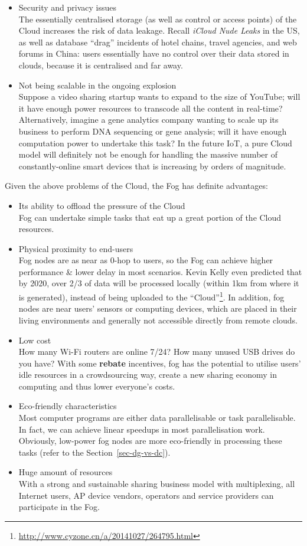 \begin{itemize}
	\item Security and privacy issues\\
	The essentially centralised storage (as well as control or access points) of the Cloud increases the risk of data leakage. Recall \emph{iCloud Nude Leaks} in the US, as well as database ``drag'' incidents of hotel chains, travel agencies, and web forums in China: users essentially have no control over their data stored in clouds, because it is centralised and far away. 
	\item Not being scalable in the ongoing explosion\\
	Suppose a video sharing startup wants to expand to the size of YouTube; will it have enough power resources to transcode all the content in real-time? Alternatively, imagine a gene analytics company wanting to scale up its business to perform DNA sequencing or gene analysis; will it have enough computation power to undertake this task? In the future IoT, a pure Cloud model will definitely not be enough for handling the massive number of constantly-online smart devices that is increasing by orders of magnitude. 
\end{itemize}

Given the above problems of the Cloud, the Fog has definite advantages: 
\begin{itemize}
	\item Its ability to offload the pressure of the Cloud\\
	Fog can undertake simple tasks that eat up a great portion of the Cloud resources.
	\item Physical proximity to end-users\\
	Fog nodes are as near as 0-hop to users, so the Fog can achieve higher performance \& lower delay in most scenarios. Kevin Kelly even predicted that by 2020, over  2/3 of data will be processed locally (within 1km from where it is generated), instead of being uploaded to the ``Cloud''\footnote{\url{http://www.cyzone.cn/a/20141027/264795.html}}. In addition, fog nodes are near users' sensors or computing devices, which are placed in their living environments and generally not accessible directly from remote clouds. 
	\item Low cost\\
	How many Wi-Fi routers are online 7/24? How many unused USB drives do you have? With some \textbf{rebate} incentives, fog has the potential to utilise users' idle resources in a crowdsourcing way, create a new sharing economy in computing and thus lower everyone's costs.  
	\item Eco-friendly characteristics\\
	Most computer programs are either data parallelisable or task parallelisable. In fact, we can achieve linear speedups in most parallelisation work. Obviously, low-power fog nodes are more eco-friendly in processing these tasks (refer to the Section~\ref{sec-dg-vs-dc}).
	\item Huge amount of resources\\
	With a strong and sustainable sharing business model with multiplexing, all Internet users, AP device vendors, operators and service providers can participate in the Fog. 
\end{itemize}

